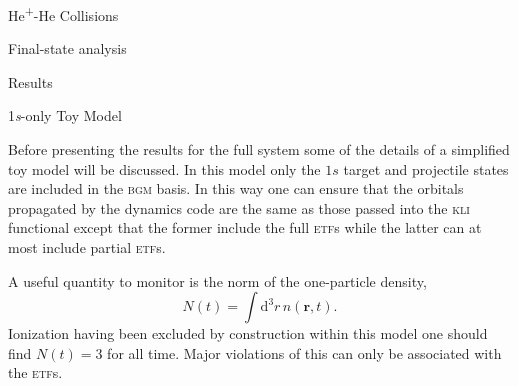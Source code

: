 \documentclass[a5paper, 9 pt]{extreport}
\begin{document}
\begin{chapter}{\texorpdfstring{He\textsuperscript{+}}{He+}-He Collisions \label{chap:hephe}}
\begin{section}{Final-state analysis \label{sec:hephe-det}}
   \end{section}

   \begin{section}{Results \label{sec:hephe-disc}}

      \begin{subsection}{1\textit{s}-only Toy Model \label{sec:toy}}

         Before presenting the results for the full system some of the details of a simplified toy model
         will be discussed. In this model only the $1s$ target and projectile states are included in
         the \textsc{bgm} basis. In this way one can ensure that the orbitals propagated by the dynamics
         code are the same as those passed into the \textsc{kli} functional except that the former
         include the full \textsc{etf}s while the latter can at most include partial \textsc{etf}s.

         A useful quantity to monitor is the norm of the one-particle density,
         \begin{equation}
            N(t) = \int \mathrm{d}^3 r \, n(\mathbf{r},t).
         \end{equation}
         Ionization having been excluded by construction within this model one should find $N(t) = 3$
         for all time. Major violations of this can only be associated with the \textsc{etf}s.


\end{subsection}
\end{section}
\end{chapter}
\end{document}
